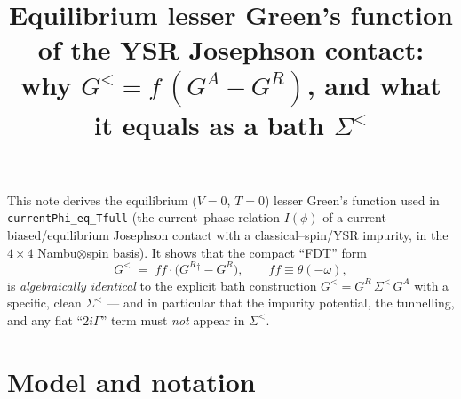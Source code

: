 \documentclass[11pt]{article}
\title{Equilibrium lesser Green's function of the YSR Josephson contact:\\
why $G^{<}=f\,(G^{A}-G^{R})$, and what it equals as a bath $\Sigma^{<}$}
\author{}
\date{}
\newcommand{\GR}{G^{R}}
\newcommand{\GA}{G^{A}}
\newcommand{\Sless}{\Sigma^{<}}
\newcommand{\dg}{^{\dagger}}
\begin{document}
\maketitle

\noindent
This note derives the equilibrium ($V=0$, $T=0$) lesser Green's function used in
\texttt{currentPhi\_eq\_Tfull} (the current--phase relation $I(\phi)$ of a
current--biased/equilibrium Josephson contact with a classical--spin/YSR impurity,
in the $4\times4$ Nambu$\otimes$spin basis). It shows that the compact ``FDT'' form
\[
  G^{<} \;=\; ff\cdot\bigl(\GR{}\dg - \GR\bigr),\qquad ff \equiv \theta(-\omega),
\]
is \emph{algebraically identical} to the explicit bath construction
$G^{<}=\GR\,\Sless\,\GA$ with a specific, clean $\Sless$ --- and in particular that
the impurity potential, the tunnelling, and any flat ``$2i\Gamma$'' term must
\emph{not} appear in $\Sless$.

\section{Model and notation}
\end{document}
